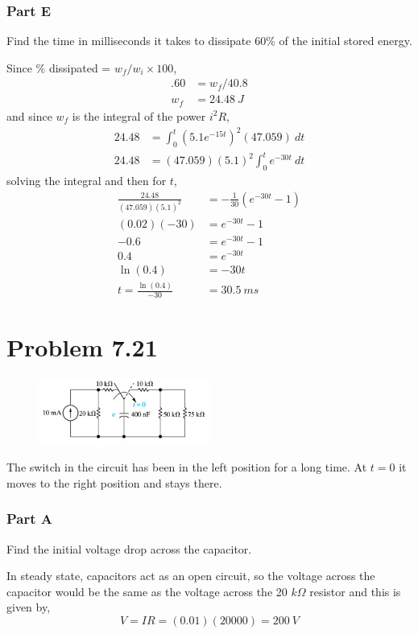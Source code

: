 \documentclass[12pt]{article}
\begin{document}
    \subsubsection*{Part E} Find the time in milliseconds it takes to dissipate 60\% of the initial stored energy. \\
    \par Since \% dissipated = $w_f / w_i \times 100$,
    \begin{align*}
        .60 &= w_f / 40.8 \\
        w_f &= 24.48\ J
    \end{align*}
    and since $w_f$ is the integral of the power $i^2R$,
    \begin{align*}
        24.48 &= \int_0^{t} (5.1e^{-15t})^2 (47.059)\ dt \\
        24.48 &= (47.059) (5.1)^2 \int_0^{t} e^{-30t}\ dt
    \end{align*}
    solving the integral and then for $t$,
    \begin{align*}
        \frac{24.48}{(47.059) (5.1)^2} &= -\frac{1}{30}(e^{-30t}-1) \\
        (0.02) (-30) &= e^{-30t} - 1 \\
        -0.6 &= e^{-30t} - 1 \\
        0.4 &= e^{-30t} \\
        \ln(0.4) &= -30t \\
        t = \frac{\ln(0.4)}{-30} &= \boxed{30.5\ ms}
    \end{align*}
    \newpage
    \section*{Problem 7.21}
    \begin{figure}[h]
        \centering
        \includegraphics[width=0.5\textwidth]{7.21 Figure.png}
    \end{figure}
    \par The switch in the circuit has been in the left position for a long time. At $t = 0$ it moves to the right position and stays there.
    \subsubsection*{Part A} Find the initial voltage drop across the capacitor. \\
    \par In steady state, capacitors act as an open circuit, so the voltage across the capacitor would be the same as the voltage across the 20 $k\Omega$ resistor and this is given by,
    \[
        V = IR = (0.01) (20000) = \boxed{200\ V}
    \]
\end{document}
